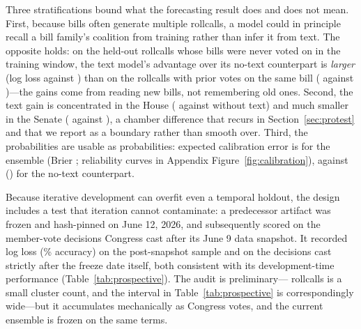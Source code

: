 \documentclass[12pt]{article}
\begin{document}
Three stratifications bound what the forecasting result does and does
not mean. First, because bills often generate multiple rollcalls, a
model could in principle recall a bill family's coalition from
training rather than infer it from text. The opposite holds: on the
\freshRC{} held-out rollcalls whose bills were never voted on in the
training window, the text model's advantage over its no-text
counterpart is \emph{larger} (log loss \freshLLchamp{} against
\freshLLnotext) than on the \seenRC{} rollcalls with prior votes on
the same bill (\seenLLchamp{} against \seenLLnotext)---the gains come
from reading new bills, not remembering old ones. Second, the text
gain is concentrated in the House (\houseLLchamp{} against
\houseLLnotext{} without text) and much smaller in the Senate
(\senateLLchamp{} against \senateLLnotext), a chamber difference that
recurs in Section~\ref{sec:protest} and that we report as a boundary
rather than smooth over. Third, the probabilities are usable as
probabilities: expected calibration error is \eceChamp{} for the
ensemble (Brier \brierChamp; reliability curves in
Appendix Figure~\ref{fig:calibration}), against \eceNotext{}
(\brierNotext) for the no-text counterpart.

Because iterative development can overfit even a temporal holdout,
the design includes a test that iteration cannot contaminate: a
predecessor artifact was frozen and hash-pinned on June 12, 2026, and
subsequently scored on the \prospectiveN{} member-vote decisions
Congress cast after its June 9 data snapshot. It recorded
\prospectiveVoneLL{} log loss (\prospectiveVoneAcc\% accuracy) on the
post-snapshot sample and \postFreezeLL{} on the \postFreezeN{}
decisions cast strictly after the freeze date itself, both consistent
with its development-time performance (Table~\ref{tab:prospective}).
The audit is preliminary---\prospectiveRC{} rollcalls is a small
cluster count, and the interval in Table~\ref{tab:prospective} is
correspondingly wide---but it accumulates mechanically as Congress
votes, and the current ensemble is frozen on the same terms.

\begin{table}[t]
\centering
\caption{Temporal-forecast comparison: test log loss and accuracy
under identical evaluation. The right panel reports congress-out
transfer, anticipating Section~\ref{sec:limits}.}
\label{tab:regime}

\end{table}

\begin{table}[t]
\centering
\caption{Frozen, hash-pinned artifacts scored on votes cast after
their June 9, 2026 data snapshot (freeze dates June 12 and July 3).
The bootstrap 95\% interval for the v1 log loss is
\prospLLlo--\prospLLhi.}
\label{tab:prospective}

\end{table}
\end{document}
